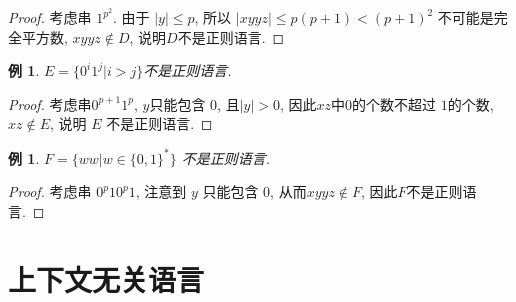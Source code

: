 \documentclass[8pt]{article}
\theoremstyle{compact}
\newtheorem{example}[theorem]{例}
\def\le{\leqslant}
\begin{document}
\begin{proof}
	考虑串 $1^{p^2}$. 由于 $|y| \le p$, 所以 $|xyyz| \le p(p+1) < (p+1)^2$ 不可能是完全平方数, $xyyz \notin D$, 说明$D$不是正则语言.
\end{proof}
\begin{example}
	$E = \{0^i1^j | i > j\}$不是正则语言. 
\end{example}
\begin{proof}
	考虑串$0^{p+1}1^p$, $y$只能包含 $0$, 且$|y| > 0$, 因此$xz$中$0$的个数不超过 $1$的个数, $xz \notin E$, 说明 $E$ 不是正则语言.
\end{proof}
\begin{example}
	$F = \{ww | w \in \{0, 1\}^*\}$ 不是正则语言.
\end{example}
\begin{proof}
	考虑串 $0^p10^p1$, 注意到 $y$ 只能包含 $0$, 从而$xyyz \notin F$, 因此$F$不是正则语言.
\end{proof}
\newpage
\section{上下文无关语言}
\end{document}
